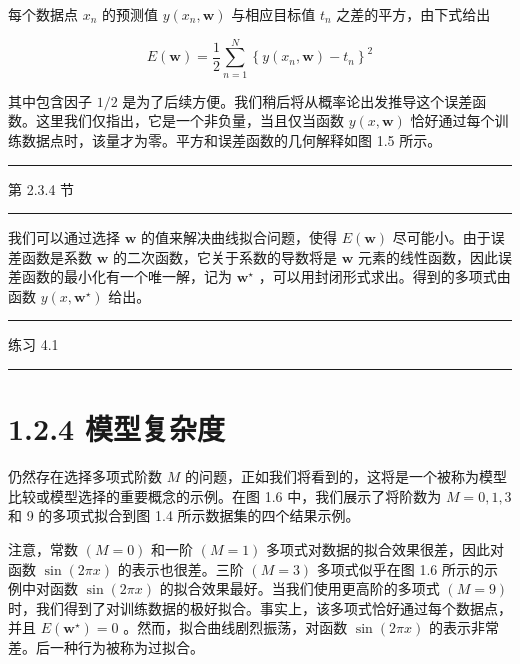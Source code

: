 \documentclass[10pt]{report}
\newcommand{\HRule}{\begin{center}\rule{0.9\linewidth}{0.2mm}\end{center}}
\begin{document}
每个数据点 \({x}_{n}\) 的预测值 \(y\left( {{x}_{n},\mathbf{w}}\right)\) 与相应目标值 \({t}_{n}\) 之差的平方，由下式给出

\[
E\left( \mathbf{w}\right)  = \frac{1}{2}\mathop{\sum }\limits_{{n = 1}}^{N}{\left\{  y\left( {x}_{n},\mathbf{w}\right)  - {t}_{n}\right\}  }^{2} \tag{1.2}
\]

其中包含因子 \(1/2\) 是为了后续方便。我们稍后将从概率论出发推导这个误差函数。这里我们仅指出，它是一个非负量，当且仅当函数 \(y\left( {x,\mathbf{w}}\right)\) 恰好通过每个训练数据点时，该量才为零。平方和误差函数的几何解释如图 1.5 所示。

\HRule

第 2.3.4 节

\HRule

我们可以通过选择 \(\mathbf{w}\) 的值来解决曲线拟合问题，使得 \(E\left( \mathbf{w}\right)\) 尽可能小。由于误差函数是系数 \(\mathbf{w}\) 的二次函数，它关于系数的导数将是 \(\mathbf{w}\) 元素的线性函数，因此误差函数的最小化有一个唯一解，记为 \({\mathbf{w}}^{ \star  }\) ，可以用封闭形式求出。得到的多项式由函数 \(y\left( {x,{\mathbf{w}}^{ \star  }}\right)\) 给出。

\HRule

练习 4.1

\HRule

\section*{1.2.4 模型复杂度}

仍然存在选择多项式阶数 \(M\) 的问题，正如我们将看到的，这将是一个被称为模型比较或模型选择的重要概念的示例。在图 1.6 中，我们展示了将阶数为 \(M = 0,1,3\) 和 9 的多项式拟合到图 1.4 所示数据集的四个结果示例。

注意，常数 \(\left( {M = 0}\right)\) 和一阶 \(\left( {M = 1}\right)\) 多项式对数据的拟合效果很差，因此对函数 \(\sin \left( {2\pi x}\right)\) 的表示也很差。三阶 \(\left( {M = 3}\right)\) 多项式似乎在图 1.6 所示的示例中对函数 \(\sin \left( {2\pi x}\right)\) 的拟合效果最好。当我们使用更高阶的多项式 \(\left( {M = 9}\right)\) 时，我们得到了对训练数据的极好拟合。事实上，该多项式恰好通过每个数据点，并且 \(E\left( {\mathbf{w}}^{ \star  }\right)  = 0\) 。然而，拟合曲线剧烈振荡，对函数 \(\sin \left( {2\pi x}\right)\) 的表示非常差。后一种行为被称为过拟合。
\end{document}

